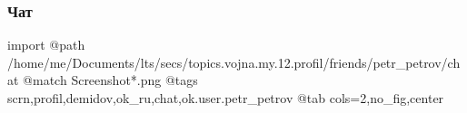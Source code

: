  
 
 
 
 

\subsubsection{Чат}

\ifcmt
  import
  @path /home/me/Documents/lts/secs/topics.vojna.my.12.profil/friends/petr_petrov/chat
  @match Screenshot*.png
  @tags scrn,profil,demidov,ok_ru,chat,ok.user.petr_petrov
  @tab cols=2,no_fig,center
\fi

